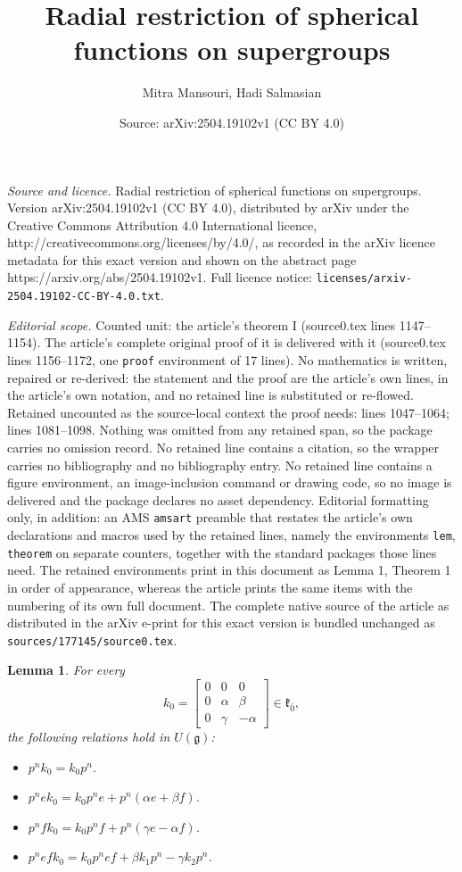 \documentclass[10pt,a4paper]{amsart}
\title{Radial restriction of spherical functions on supergroups}
\author{Mitra Mansouri, Hadi Salmasian}
\date{Source: arXiv:2504.19102v1 (CC BY 4.0)}
\newtheorem{lem}{Lemma}
\newcommand{\g}{\mathfrak}
\begin{document}
\maketitle

\noindent\emph{Source and licence.} Radial restriction of spherical functions on supergroups. Version arXiv:2504.19102v1 (CC BY 4.0), distributed by arXiv under the Creative Commons Attribution 4.0 International licence, http://creativecommons.org/licenses/by/4.0/, as recorded in the arXiv licence metadata for this exact version and shown on the abstract page https://arxiv.org/abs/2504.19102v1. Full licence notice: \texttt{licenses/arxiv-2504.19102-CC-BY-4.0.txt}.\par\smallskip

\noindent\textit{Editorial scope.} Counted unit: the article's theorem I (source0.tex lines 1147--1154). The article's complete original proof of it is delivered with it (source0.tex lines 1156--1172, one \texttt{proof} environment of 17 lines). No mathematics is written, repaired or re-derived: the statement and the proof are the article's own lines, in the article's own notation, and no retained line is substituted or re-flowed.  Retained uncounted as the source-local context the proof needs: lines 1047--1064; lines 1081--1098.  Nothing was omitted from any retained span, so the package carries no omission record.  No retained line contains a citation, so the wrapper carries no bibliography and no bibliography entry.  No retained line contains a figure environment, an image-inclusion command or drawing code, so no image is delivered and the package declares no asset dependency.  Editorial formatting only, in addition: an AMS \texttt{amsart} preamble that restates the article's own declarations and macros used by the retained lines, namely the environments \texttt{lem}, \texttt{theorem} on separate counters, together with the standard packages those lines need.  The retained environments print in this document as Lemma 1, Theorem 1 in order of appearance, whereas the article prints the same items with the numbering of its own full document.  The complete native source of the article as distributed in the arXiv e-print for this exact version is bundled unchanged as \texttt{sources/177145/source0.tex}.
\begin{lem}\label{firstpart}
For every 
\[k_0=\begin{bmatrix}
0&0&0\\
0&\alpha&\beta\\
0&\gamma&-\alpha
\end{bmatrix}
\in \g k_{\bar{0}},
\] the following relations hold in $U(\g g)$:
\begin{itemize}
\item[\rm (i)] 
$p^nk_0=k_0p^n$.
\item[\rm (ii)]
$p^nek_0=k_0p^ne+p^n(\alpha e+\beta f)$.
\item[\rm (iii)] $p^nfk_0=k_0p^nf+p^n(\gamma e-\alpha f)$.
\item[\rm (iv)] $p^nefk_0=k_0p^nef+\beta k_1 p^n-\gamma k_2 p^n$.
\end{itemize}
\end{lem}
\end{document}
